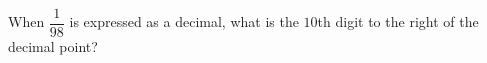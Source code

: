When $\dfrac{1}{98}$ is expressed as a decimal, what is the $10$th digit to the right of the decimal point?
